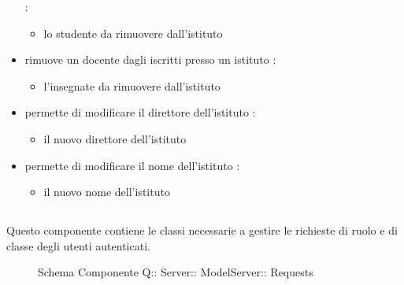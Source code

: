 \begin{itemize}
 :
\begin{itemize}
\item {}
\newline
lo studente da rimuovere dall'istituto
\end{itemize}
\item {}
\newline
rimuove un docente dagli iscritti presso un istituto
\newline
{} :
\begin{itemize}
\item {}
\newline
l'insegnate da rimuovere dall'istituto
\end{itemize}
\item {}
\newline
permette di modificare il direttore dell'istituto
\newline
{} :
\begin{itemize}
\item {}
\newline
il nuovo direttore dell'istituto
\end{itemize}
\item {}
\newline
permette di modificare il nome dell'istituto
\newline
{} :
\begin{itemize}
\item {}
\newline
il nuovo nome dell'istituto
\end{itemize}
\end{itemize}
\subsection{}
Questo componente contiene le classi necessarie a gestire le richieste di ruolo e di classe degli utenti autenticati.
\begin{figure}[H]
\centering
\noindent{}
\caption[Schema Componente Quizzipedia::Server::ModelServer::Requests]{Schema Componente Q:: Server:: ModelServer:: Requests}
\end{figure}
